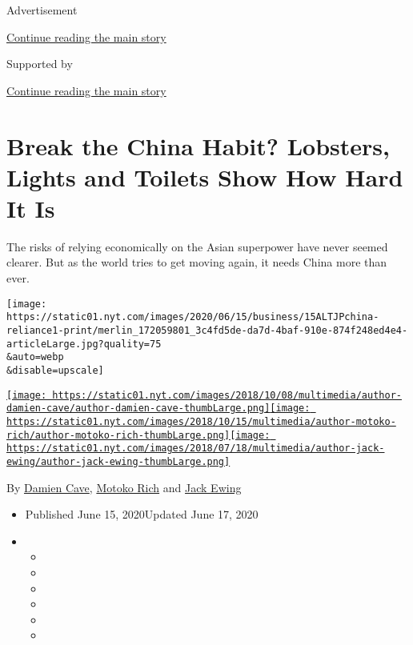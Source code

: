 Advertisement

\protect\hyperlink{after-top}{Continue reading the main story}

Supported by

\protect\hyperlink{after-sponsor}{Continue reading the main story}

\hypertarget{break-the-china-habit-lobsters-lights-and-toilets-show-how-hard-it-is}{%
\section{Break the China Habit? Lobsters, Lights and Toilets Show How
Hard It
Is}\label{break-the-china-habit-lobsters-lights-and-toilets-show-how-hard-it-is}}

The risks of relying economically on the Asian superpower have never
seemed clearer. But as the world tries to get moving again, it needs
China more than ever.

\texttt{[image: https://static01.nyt.com/images/2020/06/15/business/15ALTJPchina-reliance1-print/merlin\_172059801\_3c4fd5de-da7d-4baf-910e-874f248ed4e4-articleLarge.jpg?quality=75\\\&auto=webp\\\&disable=upscale]}

\href{https://www.nytimes.com/by/damien-cave}{\texttt{[image: https://static01.nyt.com/images/2018/10/08/multimedia/author-damien-cave/author-damien-cave-thumbLarge.png]}}\href{https://www.nytimes.com/by/motoko-rich}{\texttt{[image: https://static01.nyt.com/images/2018/10/15/multimedia/author-motoko-rich/author-motoko-rich-thumbLarge.png]}}\href{https://www.nytimes.com/by/jack-ewing}{\texttt{[image: https://static01.nyt.com/images/2018/07/18/multimedia/author-jack-ewing/author-jack-ewing-thumbLarge.png]}}

By \href{https://www.nytimes.com/by/damien-cave}{Damien Cave},
\href{https://www.nytimes.com/by/motoko-rich}{Motoko Rich} and
\href{https://www.nytimes.com/by/jack-ewing}{Jack Ewing}

\begin{itemize}
\item
  Published June 15, 2020Updated June 17, 2020
\item
  \begin{itemize}
  \item
  \item
  \item
  \item
  \item
  \item
  \end{itemize}
\end{itemize}

